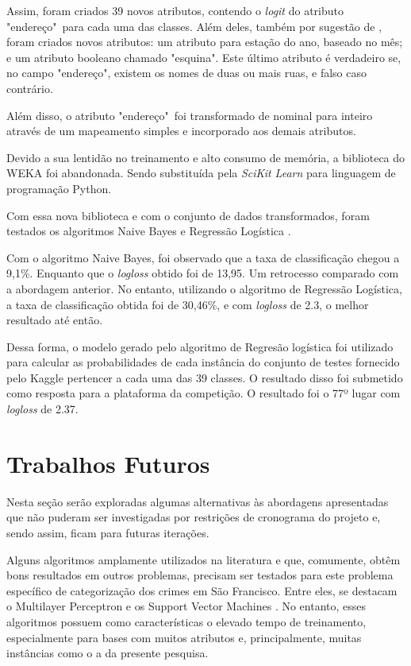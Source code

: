 \documentclass[conference]{IEEEtran}
\begin{document}
Assim, foram criados 39 novos atributos, contendo o \textit{logit} do atributo 
"endereço"\ para cada uma das classes. Além deles, também por sugestão de 
\cite{papadopc}, foram criados novos atributos: um atributo para estação do ano, 
baseado no mês; e um atributo booleano chamado "esquina". Este último atributo é 
verdadeiro se, no campo "endereço", existem os nomes de duas ou mais ruas, e 
falso caso contrário.

Além disso, o atributo "endereço"\ foi transformado de nominal para inteiro 
através de um mapeamento simples e incorporado aos demais atributos.

Devido a sua lentidão no treinamento e alto consumo de memória, a biblioteca do 
WEKA foi abandonada. Sendo substituída pela \textit{SciKit Learn} \cite{sklearn} 
para linguagem de programação Python.

Com essa nova biblioteca e com o conjunto de dados transformados, foram testados 
os algoritmos Naive Bayes e Regressão Logística \cite{logisticreg}.

Com o algoritmo Naive Bayes, foi observado que a taxa de classificação chegou a 
9,1\%. Enquanto que o \textit{logloss} obtido foi de 13,95. Um retrocesso 
comparado com a abordagem anterior. No entanto, utilizando o algoritmo de 
Regressão Logística, a taxa de classificação obtida foi de 30,46\%, e com 
\textit{logloss} de 2.3, o melhor resultado até então.

Dessa forma, o modelo gerado pelo algoritmo de Regresão logística foi utilizado 
para calcular as probabilidades de cada instância do conjunto de testes 
fornecido pelo Kaggle pertencer a cada uma das 39 classes. O resultado disso foi 
submetido como resposta para a plataforma da competição. O resultado foi o 77º 
lugar com \textit{logloss} de 2.37.

\section{Trabalhos Futuros}

Nesta seção serão exploradas algumas alternativas às abordagens apresentadas 
que não puderam ser investigadas por restrições de cronograma do projeto e, 
sendo assim, ficam para futuras iterações.

Alguns algoritmos amplamente utilizados na literatura e que, comumente, obtêm 
bons resultados em outros problemas, precisam ser testados para este problema 
específico de categorização dos crimes em São Francisco. Entre eles, se 
destacam o Multilayer Perceptron \cite{mlp} e os Support Vector Machines 
\cite{svm}. No entanto, esses algoritmos possuem como características o elevado 
tempo de treinamento, especialmente para bases com muitos atributos e, 
principalmente, muitas instâncias como o a da presente pesquisa.
\end{document}
